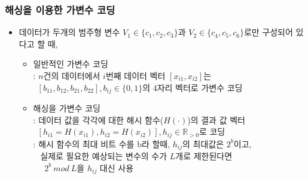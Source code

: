 \documentclass{beamer}
\begin{document}
\begin{frame}
\frametitle{해싱을 이용한 가변수 코딩}
{\footnotesize
\begin{itemize}

    \item 데이터가 두개의 범주형 변수 $V_1 \in \{c_1,c_2,c_3\}$과 $V_2 \in \{c_4,c_5,c_6\}$로만 구성되어 있다고 할 때,

    \begin{itemize}
    [circle]
    \item 일반적인 가변수 코딩
        \\: $n$건의 데이터에서 $i$번째 데이터 벡터 $[ x_{i1}, x_{i2} ]$는 \\~$[b_{11},b_{12},b_{21},b_{22}], b_{ij} \in \{0, 1\}$의 4자리 벡터로 가변수 코딩

    \item 해싱을 가변수 코딩
        \\: 데이터 값을 각각에 대한 해시 함수($H(\cdot)$)의 결과 값 벡터
         \\ ~$[ h_{i1} = H(x_{i1}), h_{i2} = H(x_{i2})], h_{ij} \in \mathbb{R}_{>0}$로 코딩
        \\: 해시 함수의 최대 비트 수를 b라 할때, $h_{ij}$의 최대값은 $2^b$이고,
        \\ ~ 실제로 필요한 예상되는 변수의 수가 $L$개로 제한된다면
        \\ ~~ $2^b ~mod~ L$을 $h_{ij}$ 대신 사용
    \end{itemize}


\end{itemize}
}
\end{frame}
\end{document}

